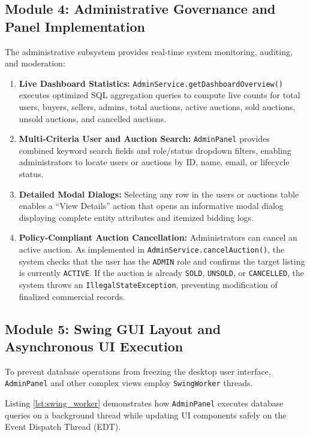 \subsection{Module 4: Administrative Governance and Panel Implementation}
The administrative subsystem provides real-time system monitoring, auditing, and moderation:
\begin{enumerate}
    \item \textbf{Live Dashboard Statistics:} \texttt{AdminService.getDashboardOverview()} executes optimized SQL aggregation queries to compute live counts for total users, buyers, sellers, admins, total auctions, active auctions, sold auctions, unsold auctions, and cancelled auctions.
    \item \textbf{Multi-Criteria User and Auction Search:} \texttt{AdminPanel} provides combined keyword search fields and role/status dropdown filters, enabling administrators to locate users or auctions by ID, name, email, or lifecycle status.
    \item \textbf{Detailed Modal Dialogs:} Selecting any row in the users or auctions table enables a ``View Details'' action that opens an informative modal dialog displaying complete entity attributes and itemized bidding logs.
    \item \textbf{Policy-Compliant Auction Cancellation:} Administrators can cancel an active auction. As implemented in \texttt{AdminService.cancelAuction()}, the system checks that the user has the \texttt{ADMIN} role and confirms the target listing is currently \texttt{ACTIVE}. If the auction is already \texttt{SOLD}, \texttt{UNSOLD}, or \texttt{CANCELLED}, the system throws an \texttt{IllegalStateException}, preventing modification of finalized commercial records.
\end{enumerate}

\subsection{Module 5: Swing GUI Layout and Asynchronous UI Execution}
To prevent database operations from freezing the desktop user interface, \texttt{AdminPanel} and other complex views employ \texttt{SwingWorker} threads.

Listing \ref{lst:swing_worker} demonstrates how \texttt{AdminPanel} executes database queries on a background thread while updating UI components safely on the Event Dispatch Thread (EDT).

